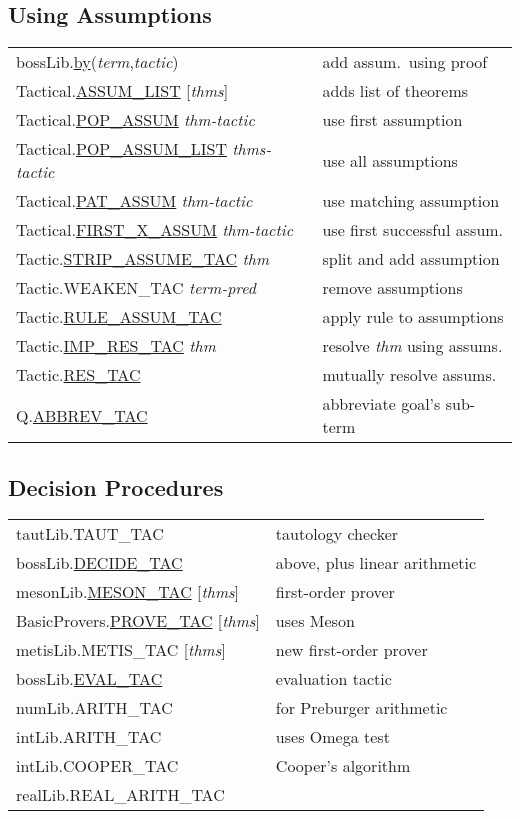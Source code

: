 \documentclass[landscape,10pt]{article}
\newcommand{\hol}[2]{{\sffamily #1.\href{#1.#2.html}{#2}}}
\newcommand{\holnoref}[2]{{\sffamily #1.#2}}
\newcommand{\var}[1]{{\emph{#1}}}
\begin{document}
\begin{multicols}{3}
\subsection*{Using Assumptions}
\begin{tabular}{ll}
\hol{bossLib}{by}(\var{term},\var{tactic}) & add assum.\ using proof \\ %
\hol{Tactical}{ASSUM_LIST} [\var{thms}] & adds list of theorems \\
\hol{Tactical}{POP_ASSUM} \var{thm-tactic} & use first assumption \\
\hol{Tactical}{POP_ASSUM_LIST} \var{thms-tactic} & use all assumptions \\
\hol{Tactical}{PAT_ASSUM} \var{thm-tactic} & use matching assumption \\
\hol{Tactical}{FIRST_X_ASSUM} \var{thm-tactic} & use first successful assum. \\
\hol{Tactic}{STRIP_ASSUME_TAC} \var{thm} & split and add assumption \\
\holnoref{Tactic}{WEAKEN_TAC} \var{term-pred} & remove assumptions \\
\hol{Tactic}{RULE_ASSUM_TAC} & apply rule to assumptions \\
\hol{Tactic}{IMP_RES_TAC} \var{thm} & resolve \var{thm} using assums. \\
\hol{Tactic}{RES_TAC} & mutually resolve assums. \\
\hol{Q}{ABBREV_TAC} & abbreviate goal's sub-term \\
\end{tabular}
\subsection*{Decision Procedures}
\begin{tabular}{ll}
\holnoref{tautLib}{TAUT_TAC} & tautology checker \\
\hol{bossLib}{DECIDE_TAC} & above, plus linear arithmetic \\
\hol{mesonLib}{MESON_TAC} [\var{thms}] & first-order prover \\
\hol{BasicProvers}{PROVE_TAC} [\var{thms}] & uses Meson \\
\holnoref{metisLib}{METIS_TAC} [\var{thms}] & new first-order prover \\
\hol{bossLib}{EVAL_TAC} & evaluation tactic  \\
\holnoref{numLib}{ARITH_TAC} & for Preburger arithmetic \\
\holnoref{intLib}{ARITH_TAC} & uses Omega test \\
\holnoref{intLib}{COOPER_TAC} & Cooper's algorithm \\
\holnoref{realLib}{REAL_ARITH_TAC} & \\
\end{tabular}
\end{multicols}
\end{document}
